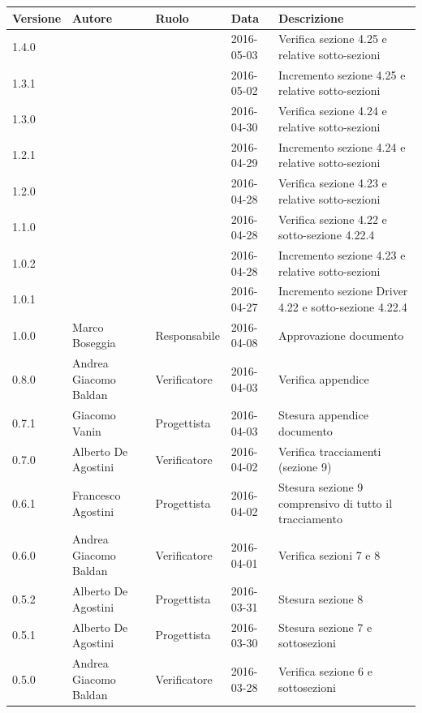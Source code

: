 \documentclass{scalatekids-article}
\begin{document}
\vspace{0cm}
\begin{center}
  \begin{longtable}{| l | l | l | l | p{5cm} |}
    \hline
    Versione & Autore & Ruolo & Data & Descrizione \\
    \hline
    1.4.0 & & & 2016-05-03 & Verifica sezione 4.25 e relative sotto-sezioni\\
    \hline
    1.3.1 & & & 2016-05-02 & Incremento sezione 4.25 e relative sotto-sezioni\\
    \hline
    1.3.0 & & & 2016-04-30 & Verifica sezione 4.24 e relative sotto-sezioni\\
    \hline
    1.2.1 & & & 2016-04-29 & Incremento sezione 4.24 e relative sotto-sezioni\\
    \hline
    1.2.0 & & & 2016-04-28 & Verifica sezione 4.23 e relative sotto-sezioni\\
    \hline
    1.1.0 & & & 2016-04-28 & Verifica sezione 4.22 e sotto-sezione 4.22.4\\
    \hline
    1.0.2 & & & 2016-04-28 & Incremento sezione 4.23 e relative sotto-sezioni\\
    \hline
    1.0.1 & & & 2016-04-27 & Incremento sezione Driver 4.22 e sotto-sezione 4.22.4\\
    \hline
    1.0.0 & Marco Boseggia & Responsabile & 2016-04-08 & Approvazione documento\\
    \hline
    0.8.0 & Andrea Giacomo Baldan & Verificatore & 2016-04-03 & Verifica appendice\\
    \hline
    0.7.1 & Giacomo Vanin & Progettista & 2016-04-03 & Stesura appendice documento\\
    \hline
    0.7.0 & Alberto De Agostini & Verificatore & 2016-04-02 & Verifica tracciamenti (sezione 9)\\
    \hline
    0.6.1 & Francesco Agostini & Progettista & 2016-04-02 & Stesura sezione 9 comprensivo di tutto il tracciamento\\
    \hline
    0.6.0 & Andrea Giacomo Baldan & Verificatore & 2016-04-01 & Verifica sezioni 7 e 8 \\
    \hline
    0.5.2 & Alberto De Agostini & Progettista & 2016-03-31 & Stesura sezione 8\\
    \hline
    0.5.1 & Alberto De Agostini & Progettista & 2016-03-30 & Stesura sezione 7 e sottosezioni\\
    \hline
    0.5.0 & Andrea Giacomo Baldan & Verificatore & 2016-03-28 & Verifica sezione 6 e sottosezioni\\

\end{longtable}
\end{center}
\end{document}
